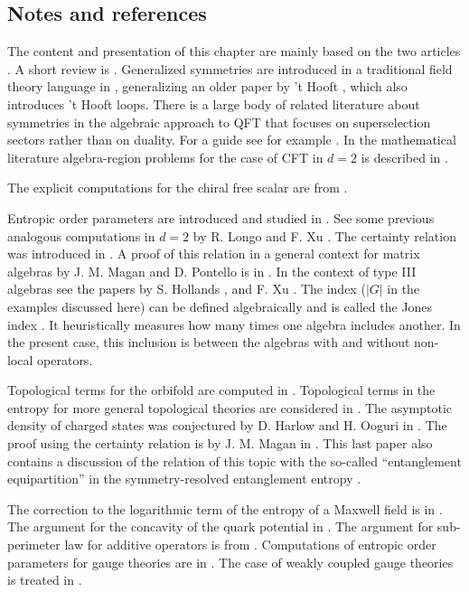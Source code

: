 \documentclass[11pt]{article}
\numberwithin{equation}{section}
\begin{document}
\subsection{Notes and references}
The content and presentation of this chapter are mainly based on the two articles \cite{casini2020entanglement,Casini:2020rgj}. A short review is \cite{Casini:2021zgr}. Generalized symmetries are introduced in a traditional field theory language in \cite{aharony2013reading}, generalizing an older paper by 't Hooft \cite{tHooft:1977nqb}, which also introduces 't Hooft loops.  There is a large body of related literature about symmetries in the algebraic approach to QFT that focuses on superselection sectors rather than on duality. For a guide see for example \cite{Haag:1992hx}. In the mathematical literature algebra-region problems for the case of CFT in $d=2$ is described in \cite{brunetti1993modular}.

The explicit computations for the chiral free scalar are from \cite{Arias:2018tmw}.

Entropic order parameters are introduced and studied in \cite{casini2020entanglement,Casini:2020rgj}. See some previous analogous computations in $d=2$ by R. Longo and F. Xu \cite{Longo:2017mbg}.  The certainty relation was introduced in \cite{casini2020entanglement}. A proof of this relation in a  general context for matrix algebras by J. M. Magan and D. Pontello is in \cite{magan2021quantum}. In the context of type III algebras see the papers by S. Hollands \cite{hollands2020variational}, and F. Xu \cite{xu2020relative}. The index ($|G|$ in the examples discussed here) can be defined algebraically and is called the Jones index \cite{Jones1983,KOSAKI1986123,cmp/1104179850}. It heuristically measures how many times one algebra includes another. In the present case, this inclusion is between the algebras with and without non-local operators.
    
 Topological terms for the orbifold are computed in \cite{casini2020entanglement}. Topological terms in the entropy for more general topological theories are considered in \cite{Kitaev:2005dm,Levin:2006zz}.  The asymptotic density of charged states was conjectured by D. Harlow and H. Ooguri in \cite{Harlow:2021trr}. The proof using the certainty relation is by J. M. Magan in \cite{Magan:2021myk}. This last paper also contains a discussion of the relation of this topic with the so-called ``entanglement equipartition'' in the symmetry-resolved entanglement entropy \cite{PhysRevB.98.041106,Murciano:2020vgh}. 
 
 The correction to the logarithmic term of the entropy of a Maxwell field is in \cite{casini2020logarithmic}. The argument for the concavity of the quark potential in \cite{bachas1986concavity}. The argument for sub-perimeter law for additive operators is from \cite{Casini:2020rgj}. 
Computations of entropic order parameters for gauge theories are in \cite{Casini:2020rgj}. The case of weakly coupled gauge theories is treated in \cite{Casini:2021tax}.
\newpage



{}

\end{document}
